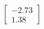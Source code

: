 \documentclass[preview]{standalone}
\begin{document}
\begin{align*}
\begin{bmatrix} -2.73 \\ 1.38 \end{bmatrix}
\end{align*}
\end{document}
